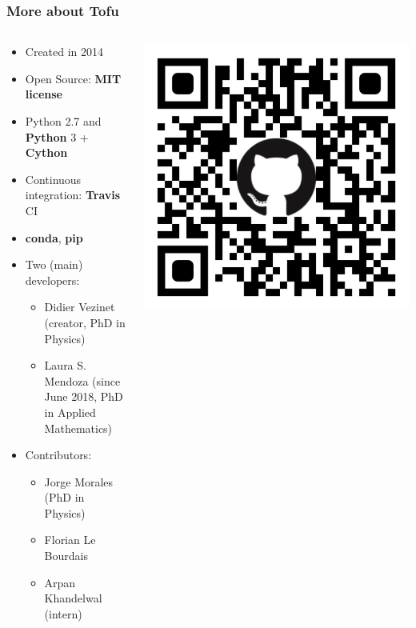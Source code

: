 \documentclass[10pt]{beamer}
\begin{document}
\begin{frame}
\frametitle{More about Tofu}

\begin{columns}
\begin{column}{0.65\textwidth}
\begin{itemize}
	\item Created in 2014
	\item Open Source:\textbf{ MIT license}
	\item Python 2.7 and \textbf{Python} 3 + \textbf{Cython}
	\item Continuous integration: \textbf{Travis} CI
	\item \textbf{conda}, \textbf{pip}
	\item Two (main) developers:
	\begin{itemize}
		\item Didier Vezinet (creator, PhD in Physics)
		\item Laura S. Mendoza (since June 2018, PhD in Applied Mathematics)
	\end{itemize}
	\item Contributors:
	\begin{itemize}
		\item Jorge Morales (PhD in Physics)
		\item Florian Le Bourdais
		\item Arpan Khandelwal (intern)
	\end{itemize}
\end{itemize}
\end{column}
\begin{column}{0.35\textwidth}
\begin{center}
    	\includegraphics[width=\textwidth]{figures/qr-code.png}

\end{center}
\end{column}
\end{columns}
\end{frame}
\end{document}
